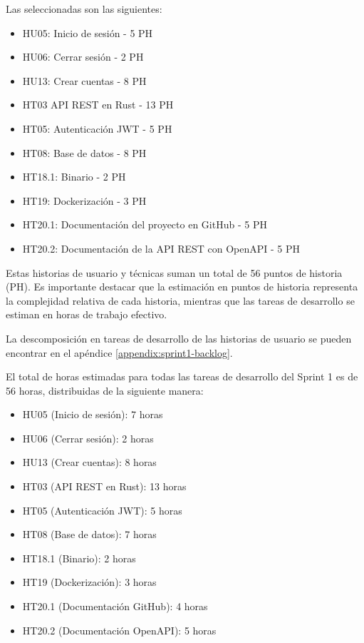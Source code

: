 Las seleccionadas son las siguientes:
\begin{itemize}
    \item HU05: Inicio de sesión - 5 PH
    \item HU06: Cerrar sesión - 2 PH
    \item HU13: Crear cuentas - 8 PH
    \item HT03 API REST en Rust - 13 PH
    \item HT05: Autenticación JWT - 5 PH
    \item HT08: Base de datos - 8 PH
    \item HT18.1: Binario - 2 PH
    \item HT19: Dockerización - 3 PH
    \item HT20.1: Documentación del proyecto en GitHub - 5 PH
    \item HT20.2: Documentación de la API REST con OpenAPI - 5 PH
\end{itemize}

Estas historias de usuario y técnicas suman un total de 56 puntos de historia (PH). Es importante destacar que la estimación en puntos de historia representa la complejidad relativa de cada historia, mientras que las tareas de desarrollo se estiman en horas de trabajo efectivo.

La descomposición en tareas de desarrollo de las historias de usuario se pueden encontrar en el apéndice \ref{appendix:sprint1-backlog}.

El total de horas estimadas para todas las tareas de desarrollo del Sprint 1 es de 56 horas, distribuidas de la siguiente manera:

\begin{itemize}
    \item HU05 (Inicio de sesión): 7 horas
    \item HU06 (Cerrar sesión): 2 horas  
    \item HU13 (Crear cuentas): 8 horas
    \item HT03 (API REST en Rust): 13 horas
    \item HT05 (Autenticación JWT): 5 horas
    \item HT08 (Base de datos): 7 horas
    \item HT18.1 (Binario): 2 horas
    \item HT19 (Dockerización): 3 horas
    \item HT20.1 (Documentación GitHub): 4 horas
    \item HT20.2 (Documentación OpenAPI): 5 horas
\end{itemize}

